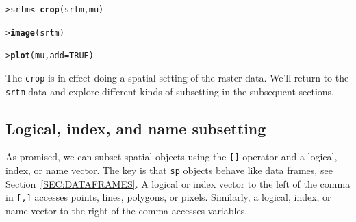 \documentclass[12pt,oneside]{book}\usepackage[]{graphicx}\usepackage[]{color}
\makeatletter
\newcommand{\hlnum}[1]{\textcolor[rgb]{0.686,0.059,0.569}{#1}}%
\newcommand{\hlstd}[1]{\textcolor[rgb]{0.345,0.345,0.345}{#1}}%
\newcommand{\hlkwb}[1]{\textcolor[rgb]{0.69,0.353,0.396}{#1}}%
\newcommand{\hlkwc}[1]{\textcolor[rgb]{0.333,0.667,0.333}{#1}}%
\newcommand{\hlkwd}[1]{\textcolor[rgb]{0.737,0.353,0.396}{\textbf{#1}}}%
\newenvironment{kframe}{%
 \def\at@end@of@kframe{}%
 \ifinner\ifhmode%
  \def\at@end@of@kframe{\end{minipage}}%
  \begin{minipage}{\columnwidth}%
 \fi\fi%
 \def\FrameCommand##1{\hskip\@totalleftmargin \hskip-\fboxsep
 \colorbox{shadecolor}{##1}\hskip-\fboxsep
     \hskip-\linewidth \hskip-\@totalleftmargin \hskip\columnwidth}%
 \MakeFramed {\advance\hsize-\width
   \@totalleftmargin\z@ \linewidth\hsize
   \@setminipage}}%
 {\par\unskip\endMakeFramed%
 \at@end@of@kframe}
\newenvironment{knitrout}{}{} %
\makeatother
\begin{document}
\begin{knitrout}
\color{fgcolor}\begin{kframe}
\begin{alltt}
\hlstd{> }\hlstd{srtm} \hlkwb{<-} \hlkwd{crop}\hlstd{(srtm, mu)}
\end{alltt}


{\ttfamily\noindent\bfseries\color{errorcolor}{Error in crop(srtm, mu): object 'srtm' not found}}\begin{alltt}
\hlstd{> }\hlkwd{image}\hlstd{(srtm)}
\end{alltt}


{\ttfamily\noindent\bfseries\color{errorcolor}{Error in image(srtm): object 'srtm' not found}}\begin{alltt}
\hlstd{> }\hlkwd{plot}\hlstd{(mu,} \hlkwc{add} \hlstd{=} \hlnum{TRUE}\hlstd{)}
\end{alltt}


{\ttfamily\noindent\bfseries\color{errorcolor}{Error in polypath(x = mcrds[, 1], y = mcrds[, 2], border = border, col = col, : plot.new has not been called yet}}\end{kframe}
\end{knitrout}

The \verb+crop+ is in effect doing a spatial setting of the raster data. We'll return to the \verb+srtm+ data and explore different kinds of subsetting in the subsequent sections.

\subsection{Logical, index, and name subsetting}
As promised, we can subset spatial objects using the \verb+[]+ operator and a logical, index, or name vector. The key is that \verb+sp+ objects behave like data frames, see Section~\ref{SEC:DATAFRAMES}. A logical or index vector to the left of the comma in \verb+[,]+ accesses points, lines, polygons, or pixels. Similarly, a logical, index, or name vector to the right of the comma accesses variables.
\end{document}
